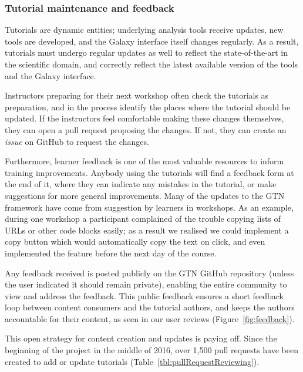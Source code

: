 \documentclass[10pt,letterpaper]{article}
\begin{document}
\subsubsection*{Tutorial maintenance and feedback}

Tutorials are dynamic entities; underlying analysis tools receive updates, new tools are developed, and the Galaxy interface itself changes regularly.
As a result, tutorials must undergo regular updates as well to reflect the state-of-the-art in the scientific domain, and correctly reflect the latest available version of the tools and the Galaxy interface.

Instructors preparing for their next workshop often check the tutorials as preparation, and in the process identify the places where the tutorial should be updated.
If the instructors feel comfortable making these changes themselves, they can open a pull request proposing the changes.
If not, they can create an \emph{issue} on GitHub to request the changes.

Furthermore, learner feedback is one of the most valuable resources to inform training improvements.
Anybody using the tutorials will find a feedback form at the end of it, where they can indicate any mistakes in the tutorial, or make suggestions for more general improvements. Many of the updates to the GTN framework have come from suggestion by learners in workshops.
As an example, during one workshop a participant complained of the trouble copying lists of URLs or other code blocks easily; as a result we realised we could implement a copy button which would automatically copy the text on click, and even implemented the feature before the next day of the course.

Any feedback received is posted publicly on the GTN GitHub repository (unless the user indicated it should remain private), enabling the entire community to view and address the feedback.
This public feedback ensures a short feedback loop between content consumers and the tutorial authors, and keeps the authors accountable for their content, as seen in our user reviews (Figure~\ref{fig:feedback}).

This open strategy for content creation and updates is paying off.
Since the beginning of the project in the middle of 2016, over 1,500 pull requests have been created to add or update tutorials (Table~\ref{tbl:pullRequestReviewing}).
\end{document}
